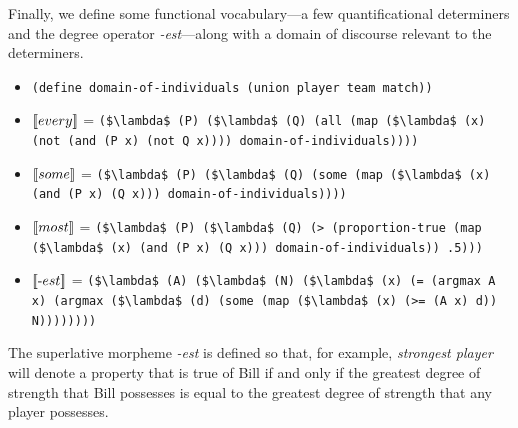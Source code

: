 \documentclass[12pt]{article}
\newcommand{\llbracket}{\ensuremath{\left [\!\left [}}%
\newcommand{\rrbracket}{\ensuremath{\right ]\!\right ]}}
\providecommand{\sv}[1]{\ensuremath{\llbracket #1 \rrbracket}}
\begin{document}
Finally, we define some functional vocabulary---a few quantificational determiners and the degree operator \emph{-est}---along with a domain of discourse relevant to the determiners.
\begin{itemize}
\item \lstinline{(define domain-of-individuals (union player team match))}
\item \sv{every} = \lstinline[mathescape]{($\lambda$ (P) ($\lambda$ (Q) (all (map ($\lambda$ (x) (not (and (P x) (not Q x)))) domain-of-individuals))))}
\item \sv{some} = \lstinline[mathescape]{($\lambda$ (P) ($\lambda$ (Q) (some (map ($\lambda$ (x) (and (P x) (Q x))) domain-of-individuals))))}
\item \sv{most} = \lstinline[mathescape]{($\lambda$ (P) ($\lambda$ (Q) (> (proportion-true (map ($\lambda$ (x) (and (P x) (Q x))) domain-of-individuals)) .5)))}
\item \sv{\text{-}est} = \lstinline[mathescape]{($\lambda$ (A) ($\lambda$ (N) ($\lambda$ (x) (= (argmax A x) (argmax ($\lambda$ (d) (some (map ($\lambda$ (x) (>= (A x) d)) N))))))))}
\end{itemize}
The superlative morpheme \emph{-est} is defined so that, for example, \emph{strongest player} will denote a property that is true of Bill if and only if the greatest degree of strength that Bill possesses is equal to the greatest degree of strength that any player possesses.
\end{document}
